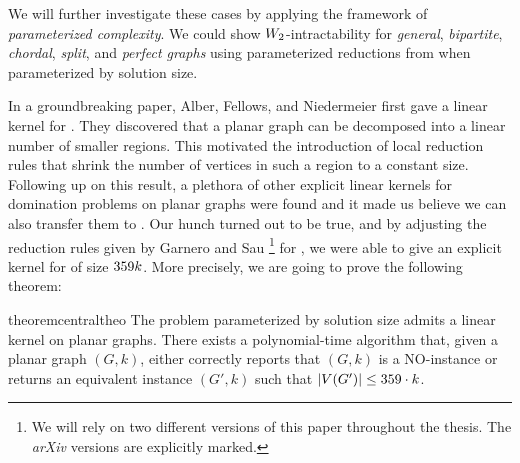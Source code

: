 We will further investigate these \NPc cases by applying the framework of \textit{parameterized complexity}. 
We could show $W_2$-intractability for \textit{general}, \textit{bipartite}, \textit{chordal}, \textit{split}, and \textit{perfect graphs} using parameterized reductions from \dom when parameterized by solution size.

In a groundbreaking paper, Alber, Fellows, and Niedermeier \cite{Alber2004} first gave a linear kernel for \pdom. 
They discovered that a planar graph can be decomposed into a linear number of smaller regions. 
This motivated the introduction of local reduction rules that shrink the number of vertices in such a region to a constant size. 
Following up on this result, a plethora of other explicit linear kernels for domination problems on planar graphs were found \cite{Guo2007, Garnero2017, Luo2013, Alber2006} and it made us believe we can also transfer them to \psdom.
Our hunch turned out to be true, and by adjusting the reduction rules given by Garnero and Sau \cite{Garnero2018}\footnote{We will rely on two different versions of this paper throughout the thesis. The \textit{arXiv} versions are explicitly marked.} for \ptdom, we were able to give an explicit kernel for \psdom of size $359 k$. 
More precisely, we are going to prove the following theorem:

\begin{restatable}[]{theorem}{centraltheo}\label{thm:central}
    The \sdom problem parameterized by solution size admits a linear kernel on planar graphs. There exists a polynomial-time algorithm that, given a planar graph $(G, k)$, either correctly reports that $(G, k)$ is a NO-instance or returns an equivalent instance $(G', k)$ such that $\abs{V(G')} \leq 359 \cdot k$.
\end{restatable}